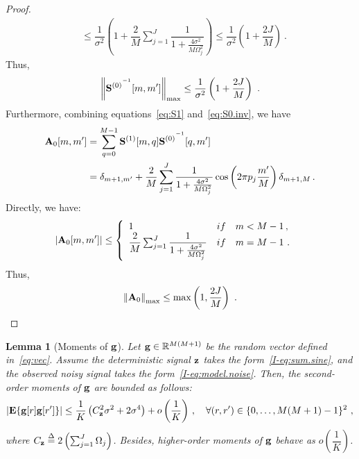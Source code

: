 \documentclass[journal,onecolumn]{IEEEtran}
\newtheorem{lemma}{Lemma}
\begin{document}
\begin{proof}
\begin{align*}
&\leq \dfrac1{\sigma^2}\left( 1+\dfrac{2}{M}\sum_{j=1}^J\dfrac{1}{1+\frac{4\sigma^2}{M\Omega_j^2}} \right) \leq \dfrac1{\sigma^2}\left( 1+\dfrac{2J}{M} \right)\ .
\end{align*}
Thus, 
\[
\left\|{{\mathbf S}^{(0)}}^{^{-1}}[m,m']\right\|_{\max}\leq\dfrac1{\sigma^2}\left( 1+\dfrac{2J}{M} \right)\ .
\]
Furthermore, combining equations~\eqref{eq:S1} and~\eqref{eq:S0.inv}, we have
\begin{align*}
{\mathbf A}_0[m,m']  &= \sum_{q=0}^{M-1} {{\mathbf S}^{(1)}}[m,q]{{\mathbf S}^{(0)}}^{^{-1}}[q,m'] \\
&= \delta_{m+1,m'} + \dfrac2M\sum_{j=1}^J\dfrac{1}{1+\frac{4\sigma^2}{M\Omega_j^2}}\cos\left(2\pi p_j\frac{m'}{M}\right)\delta_{m+1,M}\,.
\end{align*}
Directly, we have:
\begin{align*}
\left|{\mathbf A}_0[m,m']\right| &\leq \left\{
\begin{array}{ll}
1 & \relax{if}\quad m<M-1\,, \\
\dfrac{2}{M}\sum_{j=1}^J\dfrac{1}{1+\frac{4\sigma^2}{M\Omega_j^2}} & \relax{if}\quad m=M-1\ . \\
\end{array}
\right.
\end{align*}
Thus, 
\[
\left\|{\mathbf A}_0\right\|_{\max}\leq \max\left(1,\frac{2J}{M}\right)\ .
\]
\end{proof}

\begin{lemma}[Moments of ${\mathbf g}$]
Let ${\mathbf g}\in{\mathbb R}^{M(M+1)}$ be the random vector defined in~\eqref{eq:vec}. Assume the deterministic signal ${\mathbf z}$ takes the form~\eqref{I-eq:sum.sine}, and the observed noisy signal takes the form~\eqref{I-eq:model.noise}. Then, the second-order moments of ${\mathbf g}$ are bounded as follows:
\begin{equation}
\left|\bE\{\bg[r]\bg[r']\}\right| \leq \dfrac1K \left( C_\bz^2\sigma^2 + 2 \sigma^4\right) + o\left(\dfrac1K\right)\,,\quad\forall (r,r')\in\{0,\ldots,M(M+1)-1\}^2\ ,
\label{eq:gg.bound}
\end{equation}
where $C_{\mathbf z} \overset{\Delta}{=} 2\left(\sum_{j=1}^J \Omega_j\right)$. Besides, higher-order moments of ${\mathbf g}$ behave as $o\left( \dfrac1K \right)$.
\end{lemma}
\end{document}
